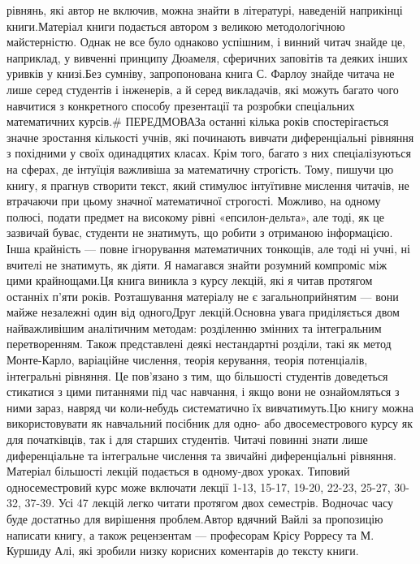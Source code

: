 \documentclass[
  ukrainian,
]{article}
\begin{document}
рівнянь, які автор не включив, можна знайти в літературі, наведеній
наприкінці книги.Матеріал книги подається автором з великою
методологічною майстерністю. Однак не все було однаково успішним, і
винний читач знайде це, наприклад, у вивченні принципу Дюамеля,
сферичних заповітів та деяких інших уривків у книзі.Без сумніву,
запропонована книга С. Фарлоу знайде читача не лише серед студентів і
інженерів, а й серед викладачів, які можуть багато чого навчитися з
конкретного способу презентації та розробки спеціальних математичних
курсів.\# ПЕРЕДМОВАЗа останні кілька років спостерігається значне
зростання кількості учнів, які починають вивчати диференціальні рівняння
з похідними у своїх одинадцятих класах. Крім того, багато з них
спеціалізуються на сферах, де інтуїція важливіша за математичну
строгість. Тому, пишучи цю книгу, я прагнув створити текст, який
стимулює інтуїтивне мислення читачів, не втрачаючи при цьому значної
математичної строгості. Можливо, на одному полюсі, подати предмет на
високому рівні «епсилон-дельта», але тоді, як це зазвичай буває,
студенти не знатимуть, що робити з отриманою інформацією. Інша крайність
--- повне ігнорування математичних тонкощів, але тоді ні учні, ні
вчителі не знатимуть, як діяти. Я намагався знайти розумний компроміс
між цими крайнощами.Ця книга виникла з курсу лекцій, які я читав
протягом останніх п'яти років. Розташування матеріалу не є
загальноприйнятим --- вони майже незалежні один від одногоДруг
лекцій.Основна увага приділяється двом найважливішим аналітичним
методам: розділенню змінних та інтегральним перетворенням. Також
представлені деякі нестандартні розділи, такі як метод Монте-Карло,
варіаційне числення, теорія керування, теорія потенціалів, інтегральні
рівняння. Це пов'язано з тим, що більшості студентів доведеться
стикатися з цими питаннями під час навчання, і якщо вони не
ознайомляться з ними зараз, навряд чи коли-небудь систематично їх
вивчатимуть.Цю книгу можна використовувати як навчальний посібник для
одно- або двосеместрового курсу як для початківців, так і для старших
студентів. Читачі повинні знати лише диференціальне та інтегральне
числення та звичайні диференціальні рівняння. Матеріал більшості лекцій
подається в одному-двох уроках. Типовий односеместровий курс може
включати лекції 1-13, 15-17, 19-20, 22-23, 25-27, 30-32, 37-39. Усі 47
лекцій легко читати протягом двох семестрів. Водночас часу буде
достатньо для вирішення проблем.Автор вдячний Вайлі за пропозицію
написати книгу, а також рецензентам --- професорам Крісу Рорресу та М.
Куршиду Алі, які зробили низку корисних коментарів до тексту книги.
\end{document}
